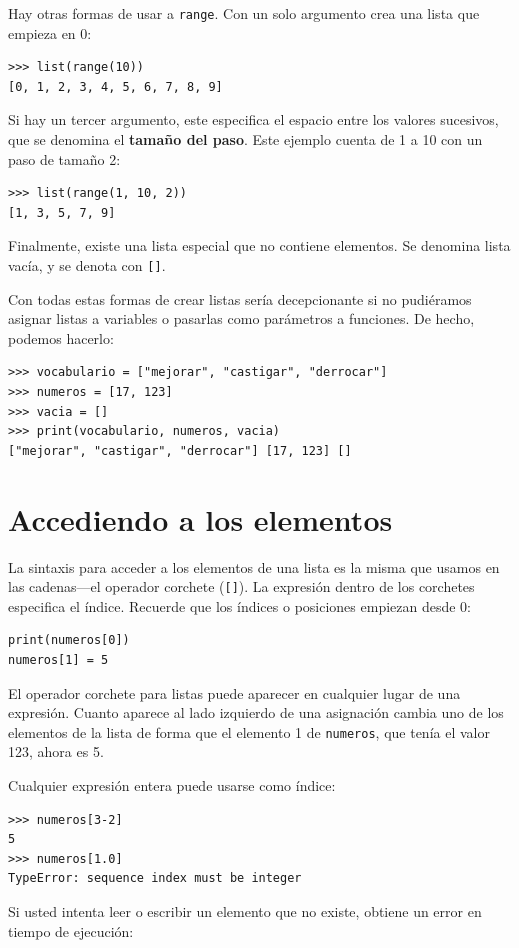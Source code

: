 Hay otras formas de usar a \texttt{range}. Con un solo argumento crea
una lista que empieza en 0:
\begin{lstlisting}
>>> list(range(10))
[0, 1, 2, 3, 4, 5, 6, 7, 8, 9]
\end{lstlisting}
Si hay un tercer argumento, este especifica el espacio entre los valores
sucesivos, que se denomina el \textbf{tamaño del paso}. Este ejemplo
cuenta de 1 a 10 con un paso de tamaño 2:
\begin{lstlisting}
>>> list(range(1, 10, 2))
[1, 3, 5, 7, 9]
\end{lstlisting}
Finalmente, existe una lista especial que no contiene elementos. Se
denomina lista vacía, y se denota con \texttt{{[}{]}}.

Con todas estas formas de crear listas sería decepcionante si no pudiéramos
asignar listas a variables o pasarlas como parámetros a funciones.
De hecho, podemos hacerlo:
\begin{lstlisting}
>>> vocabulario = ["mejorar", "castigar", "derrocar"]
>>> numeros = [17, 123]
>>> vacia = []
>>> print(vocabulario, numeros, vacia)
["mejorar", "castigar", "derrocar"] [17, 123] []
\end{lstlisting}
\section{Accediendo a los elementos}

 

La sintaxis para acceder a los elementos de una lista es la misma
que usamos en las cadenas—el operador corchete (\texttt{{[}{]}}).
La expresión dentro de los corchetes especifica el índice. Recuerde
que los índices o posiciones empiezan desde 0:
\begin{lstlisting}
print(numeros[0])
numeros[1] = 5
\end{lstlisting}
El operador corchete para listas puede aparecer en cualquier lugar
de una expresión. Cuanto aparece al lado izquierdo de una asignación
cambia uno de los elementos de la lista de forma que el elemento 1
de \texttt{numeros}, que tenía el valor 123, ahora es 5.

Cualquier expresión entera puede usarse como índice:
\begin{lstlisting}
>>> numeros[3-2]
5
>>> numeros[1.0]
TypeError: sequence index must be integer
\end{lstlisting}
Si usted intenta leer o escribir un elemento que no existe, obtiene
un error en tiempo de ejecución:

